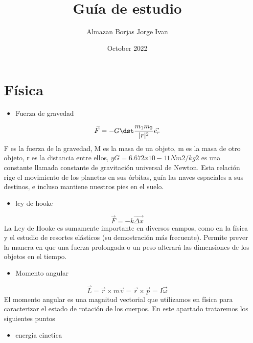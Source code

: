 \documentclass[4apaper, 12pt]{article}
\title{Guía de estudio}
\author{Almazan Borjas Jorge Ivan }
\date{October 2022}
\begin{document}
\maketitle

\section{Física}
  
  \begin{itemize}
      \item {Fuerza de gravedad}
   \end{itemize}
   \begin{equation}
       \vec{F}=-G\dst\dfrac{m_1m_2}
       {|r|^2}\vec{e_r}\\
   \end{equation}
   F es la fuerza de la gravedad, M es la masa de un objeto, m es la masa de otro objeto, r es la distancia entre ellos, 
   $y G = 6.672 x 10-11Nm2/kg2$
   es una constante llamada constante de gravitación universal de Newton. 
   Esta relación rige el movimiento de los planetas en sus órbitas, guía las naves espaciales a sus destinos, e incluso mantiene nuestros pies en el suelo. 
   \begin{itemize}
            \item{ley de hooke} 
   \end{itemize}
      \begin{equation}
         \vec{F}=-k\vec{\Delta x}
      \end{equation} 
    La Ley de Hooke es sumamente importante en diversos campos, como en la física y el estudio de resortes elásticos (su demostración más frecuente).
    Permite prever la manera en que una fuerza prolongada o un peso alterará las dimensiones de los objetos en el tiempo. 
   \begin{itemize}
       \item{Momento angular} 
   \end{itemize}   
    \begin{equation}
        \vec{L}=\vec{r}\times m\vec{v}=
        \vec {r}\times\vec{p}=I\vec{\omega}
    \end{equation}
    El momento angular es una magnitud vectorial que utilizamos en física para caracterizar el estado de rotación de los cuerpos. En este apartado trataremos los siguientes puntos
   \begin{itemize}
       \item{energia cinetica} 
   \end{itemize}
\end{document}
